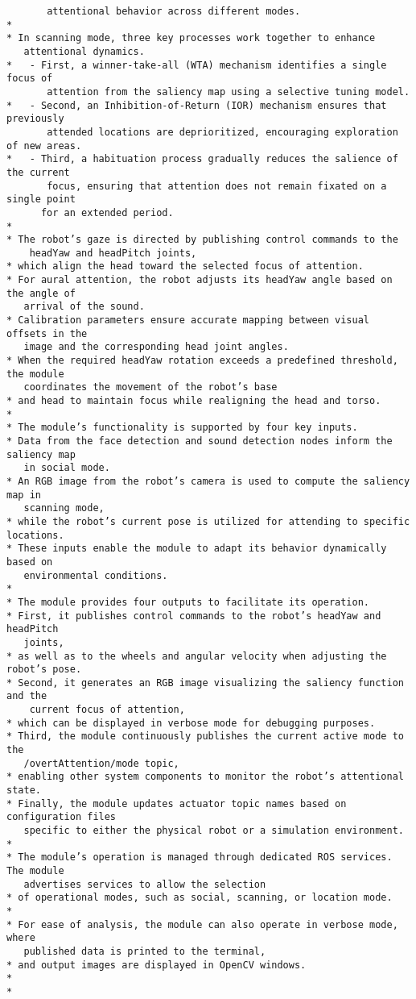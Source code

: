 \documentclass{CSSRforAfrica}
\begin{document}
\begin{description}
{\begin{verbatim}
       attentional behavior across different modes.
*
* In scanning mode, three key processes work together to enhance 
   attentional dynamics. 
*   - First, a winner-take-all (WTA) mechanism identifies a single focus of 
       attention from the saliency map using a selective tuning model. 
*   - Second, an Inhibition-of-Return (IOR) mechanism ensures that previously 
       attended locations are deprioritized, encouraging exploration of new areas. 
*   - Third, a habituation process gradually reduces the salience of the current 
       focus, ensuring that attention does not remain fixated on a single point 
      for an extended period.
*
* The robot’s gaze is directed by publishing control commands to the 
    headYaw and headPitch joints, 
* which align the head toward the selected focus of attention. 
* For aural attention, the robot adjusts its headYaw angle based on the angle of 
   arrival of the sound. 
* Calibration parameters ensure accurate mapping between visual offsets in the 
   image and the corresponding head joint angles. 
* When the required headYaw rotation exceeds a predefined threshold, the module 
   coordinates the movement of the robot’s base 
* and head to maintain focus while realigning the head and torso.
*
* The module’s functionality is supported by four key inputs. 
* Data from the face detection and sound detection nodes inform the saliency map 
   in social mode. 
* An RGB image from the robot’s camera is used to compute the saliency map in 
   scanning mode, 
* while the robot’s current pose is utilized for attending to specific locations. 
* These inputs enable the module to adapt its behavior dynamically based on 
   environmental conditions.
*
* The module provides four outputs to facilitate its operation. 
* First, it publishes control commands to the robot’s headYaw and headPitch 
   joints, 
* as well as to the wheels and angular velocity when adjusting the robot’s pose. 
* Second, it generates an RGB image visualizing the saliency function and the 
    current focus of attention, 
* which can be displayed in verbose mode for debugging purposes. 
* Third, the module continuously publishes the current active mode to the 
   /overtAttention/mode topic, 
* enabling other system components to monitor the robot’s attentional state. 
* Finally, the module updates actuator topic names based on configuration files 
   specific to either the physical robot or a simulation environment.
*
* The module’s operation is managed through dedicated ROS services. The module 
   advertises services to allow the selection 
* of operational modes, such as social, scanning, or location mode. 
*
* For ease of analysis, the module can also operate in verbose mode, where 
   published data is printed to the terminal, 
* and output images are displayed in OpenCV windows.
*
*
\end{verbatim}}


\end{description}
\end{document}
